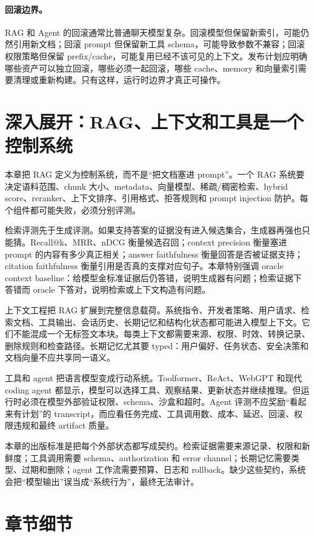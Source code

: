 \documentclass[UTF8,zihao=-4,openany]{ctexbook}
\begin{document}
\paragraph{回滚边界。}
RAG 和 Agent 的回滚通常比普通聊天模型复杂。回滚模型但保留新索引，可能仍然引用新文档；回滚 prompt 但保留新工具 schema，可能导致参数不兼容；回滚权限策略但保留 prefix/cache，可能复用已经不该可见的上下文。发布计划应明确哪些资产可以独立回滚，哪些必须一起回滚，哪些 cache、memory 和向量索引需要清理或重新构建。只有这样，运行时边界才真正可操作。

\section{深入展开：RAG、上下文和工具是一个控制系统}
本章把 RAG 定义为控制系统，而不是“把文档塞进 prompt”。一个 RAG 系统要决定语料范围、chunk 大小、metadata、向量模型、稀疏/稠密检索、hybrid score、reranker、上下文排序、引用格式、拒答规则和 prompt injection 防护。每个组件都可能失败，必须分别评测。

检索评测先于生成评测。如果支持答案的证据没有进入候选集合，生成器再强也只能猜。Recall@k、MRR、nDCG 衡量候选召回；context precision 衡量塞进 prompt 的内容有多少真正相关；answer faithfulness 衡量回答是否被证据支持；citation faithfulness 衡量引用是否真的支撑对应句子。本章特别强调 oracle context baseline：给模型金标准证据后仍答错，说明生成器有问题；检索证据下答错而 oracle 下答对，说明检索或上下文构造有问题。

上下文工程把 RAG 扩展到完整信息载荷。系统指令、开发者策略、用户请求、检索文档、工具输出、会话历史、长期记忆和结构化状态都可能进入模型上下文。它们不能混成一个无标签文本块。每类上下文都需要来源、权限、时效、转换记录、删除规则和检查路径。长期记忆尤其要 typed：用户偏好、任务状态、安全决策和文档向量不应共享同一语义。

工具和 agent 把语言模型变成行动系统。Toolformer、ReAct、WebGPT 和现代 coding agent 都显示，模型可以选择工具、观察结果、更新状态并继续推理。但运行时必须在模型外部验证权限、schema、沙盒和超时。Agent 评测不应奖励“看起来有计划”的 transcript，而应看任务完成、工具调用数、成本、延迟、回滚、权限违规和最终 artifact 质量。

本章的出版标准是把每个外部状态都写成契约。检索证据需要来源记录、权限和新鲜度；工具调用需要 schema、authorization 和 error channel；长期记忆需要类型、过期和删除；agent 工作流需要预算、日志和 rollback。缺少这些契约，系统会把“模型输出”误当成“系统行为”，最终无法审计。

\section{章节细节}
\end{document}
